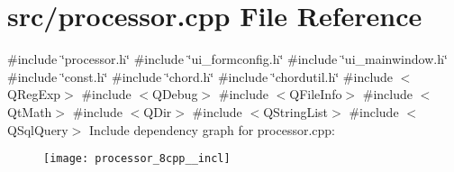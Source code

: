 \section{src/processor.cpp File Reference}
\label{processor_8cpp}
{\ttfamily \#include \char`\"{}processor.\+h\char`\"{}}\newline
{\ttfamily \#include \char`\"{}ui\+\_\+formconfig.\+h\char`\"{}}\newline
{\ttfamily \#include \char`\"{}ui\+\_\+mainwindow.\+h\char`\"{}}\newline
{\ttfamily \#include \char`\"{}const.\+h\char`\"{}}\newline
{\ttfamily \#include \char`\"{}chord.\+h\char`\"{}}\newline
{\ttfamily \#include \char`\"{}chordutil.\+h\char`\"{}}\newline
{\ttfamily \#include $<$Q\+Reg\+Exp$>$}\newline
{\ttfamily \#include $<$Q\+Debug$>$}\newline
{\ttfamily \#include $<$Q\+File\+Info$>$}\newline
{\ttfamily \#include $<$Qt\+Math$>$}\newline
{\ttfamily \#include $<$Q\+Dir$>$}\newline
{\ttfamily \#include $<$Q\+String\+List$>$}\newline
{\ttfamily \#include $<$Q\+Sql\+Query$>$}\newline
Include dependency graph for processor.\+cpp\+:\nopagebreak
\begin{figure}[H]
\begin{center}
\leavevmode
\texttt{[image: processor\_8cpp\_\_incl]}
\end{center}
\end{figure}
